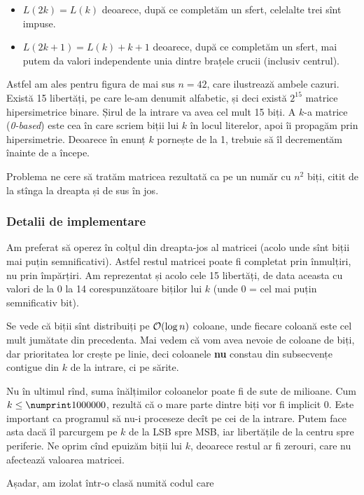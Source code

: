 \documentclass[../main.tex]{subfiles}
\begin{document}
\begin{itemize}
  \item $L(2k) = L(k)$ deoarece, după ce completăm un sfert, celelalte trei sînt impuse.
  \item $L(2k + 1) = L(k) + k + 1$ deoarece, după ce completăm un sfert, mai putem da valori independente unia dintre brațele crucii (inclusiv centrul).
\end{itemize}

Astfel am ales pentru figura de mai sus $n = 42$, care ilustrează ambele cazuri. Există 15 libertăți, pe care le-am denumit alfabetic, și deci există $2^{15}$ matrice hipersimetrice binare. Șirul de la intrare va avea cel mult 15 biți. A $k$-a matrice (\textit{0-based}) este cea în care scriem biții lui $k$ în locul literelor, apoi îi propagăm prin hipersimetrie. Deoarece în enunț $k$ pornește de la 1, trebuie să îl decrementăm înainte de a începe.

Problema ne cere să tratăm matricea rezultată ca pe un număr cu $n^2$ biți, citit de la stînga la dreapta și de sus în jos.

\subsubsection*{Detalii de implementare}

Am preferat să operez în colțul din dreapta-jos al matricei (acolo unde sînt biții mai puțin semnificativi). Astfel restul matricei poate fi completat prin înmulțiri, nu prin împărțiri. Am reprezentat și acolo cele 15 libertăți, de data aceasta cu valori de la 0 la 14 corespunzătoare biților lui $k$ (unde 0 = cel mai puțin semnificativ bit).

Se vede că biții sînt distribuiți pe $\mathcal{O}(\log n)$ coloane, unde fiecare coloană este cel mult jumătate din precedenta. Mai vedem că vom avea nevoie de coloane de biți, dar prioritatea lor crește pe linie, deci coloanele \textbf{nu} constau din subsecvențe contigue din $k$ de la intrare, ci pe sărite.

Nu în ultimul rînd, suma înălțimilor coloanelor poate fi de sute de milioane. Cum $k \leq \np{1000000}$, rezultă că o mare parte dintre biți vor fi implicit 0. Este important ca programul să nu-i proceseze decît pe cei de la intrare. Putem face asta dacă îl parcurgem pe $k$ de la LSB spre MSB, iar libertățile de la centru spre periferie. Ne oprim cînd epuizăm biții lui $k$, deoarece restul ar fi zerouri, care nu afectează valoarea matricei.

Așadar, am izolat într-o clasă numită  codul care
\end{document}
